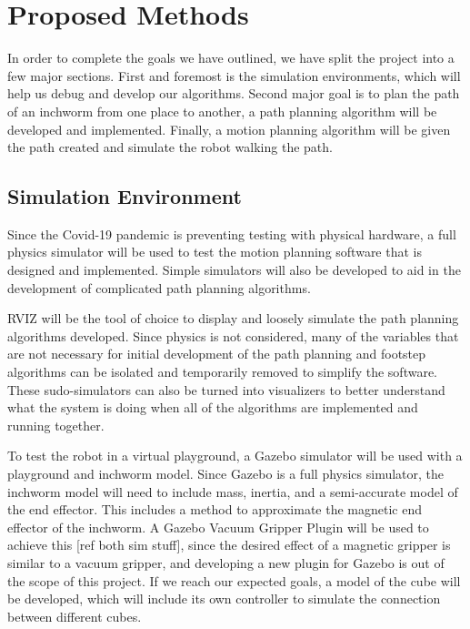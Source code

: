 \section{Proposed Methods}
In order to complete the goals we have outlined, we have split the project into a few major sections. First and foremost is the simulation environments, which will help us debug and develop our algorithms. Second major goal is to plan the path of an inchworm from one place to another, a path planning algorithm will be developed and implemented. Finally,  a motion planning algorithm will be given the path created and simulate the robot walking the path.

\subsection{Simulation Environment}
Since the Covid-19 pandemic is preventing testing with physical hardware, a full physics simulator will be used to test the motion planning software that is designed and implemented. Simple simulators will also be developed to aid in the development of complicated path planning algorithms.

RVIZ will be the tool of choice to display and loosely simulate the path planning algorithms developed. Since physics is not considered, many of the variables that are not necessary for initial development of the path planning and footstep algorithms can be isolated and temporarily removed to simplify the software. These sudo-simulators can also be turned into visualizers to better understand what the system is doing when all of the algorithms are implemented and running together.

To test the robot in a virtual playground, a Gazebo simulator will be used with a playground and inchworm model. Since Gazebo is a full physics simulator, the inchworm model will need to include mass, inertia, and a semi-accurate model of the end effector. This includes a method to approximate the magnetic end effector of the inchworm. A Gazebo Vacuum Gripper Plugin will be used to achieve this [ref both sim stuff], since the desired effect of a magnetic gripper is similar to a vacuum gripper, and developing a new plugin for Gazebo is out of the scope of this project. If we reach our expected goals, a model of the cube will be developed, which will include its own controller to simulate the connection between different cubes.

